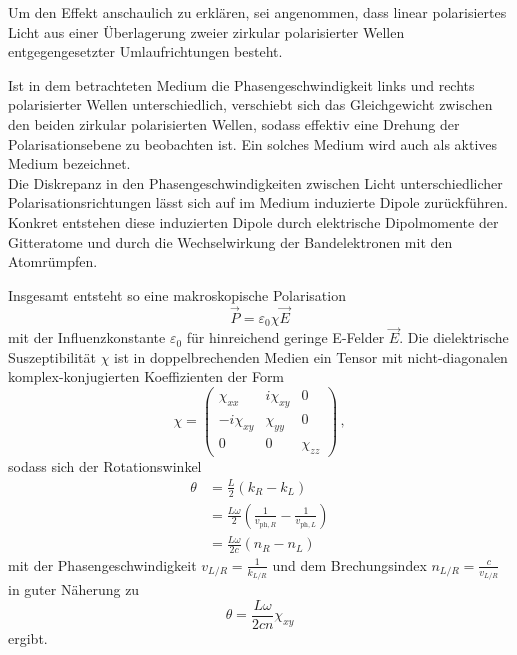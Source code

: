 Um den Effekt anschaulich zu erklären, sei angenommen, dass linear polarisiertes Licht aus einer Überlagerung zweier zirkular polarisierter Wellen
entgegengesetzter Umlaufrichtungen besteht.

Ist in dem betrachteten Medium die Phasengeschwindigkeit links und rechts polarisierter Wellen unterschiedlich, verschiebt sich das Gleichgewicht zwischen
den beiden zirkular polarisierten Wellen, sodass effektiv eine Drehung der Polarisationsebene zu beobachten ist.
Ein solches Medium wird auch als aktives Medium bezeichnet. \\

Die Diskrepanz in den Phasengeschwindigkeiten zwischen Licht unterschiedlicher Polarisationsrichtungen lässt sich auf im Medium induzierte Dipole zurückführen.
Konkret entstehen diese induzierten Dipole durch elektrische Dipolmomente der Gitteratome und durch die Wechselwirkung der Bandelektronen mit den Atomrümpfen.

Insgesamt entsteht so eine makroskopische Polarisation
\begin{equation}
    \vec{P} = \varepsilon_0 \chi \vec{E}
    \label{eq:polarisation} 
\end{equation}
mit der Influenzkonstante $\varepsilon_0$ für hinreichend geringe E-Felder $\vec{E}$.
Die dielektrische Suszeptibilität $\chi$ ist in doppelbrechenden Medien ein Tensor mit nicht-diagonalen komplex-konjugierten Koeffizienten der Form
\begin{equation*}
    \chi = \left( \begin{matrix}
        \chi_{xx}     & i\chi_{xy}    & 0 \\
        - i \chi_{xy} & \chi_{yy}     & 0 \\
        0             & 0             & \chi_{zz}
    \end{matrix}\right) \,,
\end{equation*}
sodass sich der Rotationswinkel 
\begin{align*}
    \theta &= \frac{L}{2} (k_R - k_L) \\
           &= \frac{L \omega}{2} \left(\frac{1}{v_{\text{ph},R}} - \frac{1}{v_{\text{ph},L}}\right) \\
           &= \frac{L \omega}{2 c} (n_R - n_L)
\end{align*}
mit der Phasengeschwindigkeit $v_{L/R} = \frac{1}{k_{L/R}}$ und dem Brechungsindex $n_{L/R} = \frac{c}{v_{L/R}}$ in guter Näherung zu
\begin{equation}
    \theta = \frac{L \omega}{2 c n} \chi_{xy}
    \label{eq:thetanoB}
\end{equation}
ergibt.

